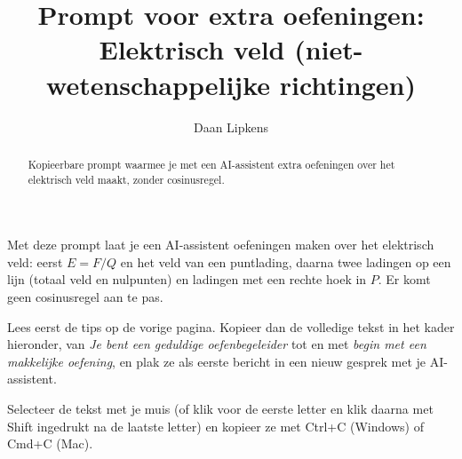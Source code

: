 \documentclass{ximera}
\title{Prompt voor extra oefeningen: Elektrisch veld (niet-wetenschappelijke richtingen)}
\author{Daan Lipkens}
\begin{document}
\begin{abstract}
    Kopieerbare prompt waarmee je met een AI-assistent extra oefeningen over het elektrisch veld maakt, zonder cosinusregel.
\end{abstract}
\maketitle

Met deze prompt laat je een AI-assistent oefeningen maken over het elektrisch veld: eerst $E = F/Q$ en het veld van een puntlading, daarna twee ladingen op een lijn (totaal veld en nulpunten) en ladingen met een rechte hoek in $P$. Er komt geen cosinusregel aan te pas.

Lees eerst de tips op de vorige pagina. Kopieer dan de volledige tekst in het kader hieronder, van \textit{Je bent een geduldige oefenbegeleider} tot en met \textit{begin met een makkelijke oefening}, en plak ze als eerste bericht in een nieuw gesprek met je AI-assistent.

\begin{onlineOnly}
    Selecteer de tekst met je muis (of klik voor de eerste letter en klik daarna met Shift ingedrukt na de laatste letter) en kopieer ze met Ctrl+C (Windows) of Cmd+C (Mac).
\end{onlineOnly}
\end{document}
